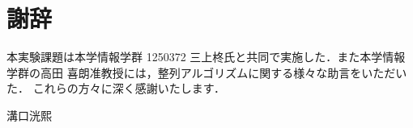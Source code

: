 \chapter*{謝辞}
本実験課題は本学情報学群 1250372 三上柊氏と共同で実施した．また本学情報学群の高田 喜朗准教授には，整列アルゴリズムに関する様々な助言をいただいた．
これらの方々に深く感謝いたします．
\begin{flushright}
    溝口洸熙
\end{flushright}